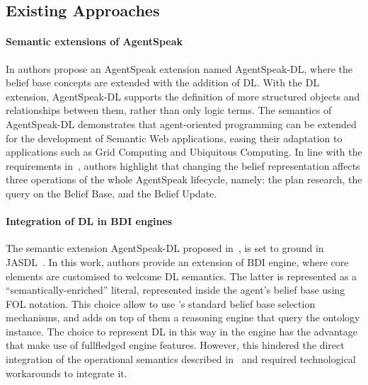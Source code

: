 \documentclass[
]{ceurart}
\begin{document}
\subsection{Existing Approaches}

\paragraph{Semantic extensions of AgentSpeak}
In \cite{DBLP:conf/dalt/MoreiraVBH05} authors propose an AgentSpeak extension named AgentSpeak-DL, 
where the belief base concepts are extended with the addition of \ac{DL}.
%
With the \ac{DL} extension, 
AgentSpeak-DL supports the definition of more structured objects and relationships between them, 
rather than only logic terms.
%
The semantics of AgentSpeak-DL demonstrates that agent-oriented programming can be extended for the development of Semantic Web applications, 
easing their adaptation to applications such as Grid Computing and Ubiquitous Computing.
%
In line with the requirements in~, 
authors highlight that changing the belief representation affects three operations of the whole AgentSpeak lifecycle, namely: the plan research, the query on the Belief Base, and the Belief Update.

\paragraph{Integration of DL in BDI engines}
The semantic extension AgentSpeak-DL proposed in~\cite{DBLP:conf/dalt/MoreiraVBH05}, 
is set to ground in JASDL~\cite{DBLP:conf/dalt/KlapiscakB08}.
%
In this work, 
authors provide an extension of \jason{} \ac{BDI} engine, 
where core elements are customised to welcome \ac{DL} semantics.
%
The latter is represented as a ``semantically-enriched'' literal,
represented inside the agent's belief base using FOL notation.
%
This choice allow to use \jason{}'s standard belief base selection mechanisms, 
and adds on top of them a reasoning engine that query the ontology instance.
%
The choice to represent \ac{DL} in this way in the engine has the advantage that make use of fullfledged \jason{} engine features.
%
However, 
this hindered the direct integration of the operational semantics described in~\cite{DBLP:conf/dalt/KlapiscakB08} 
and required technological workarounds to integrate it.
%
\end{document}
